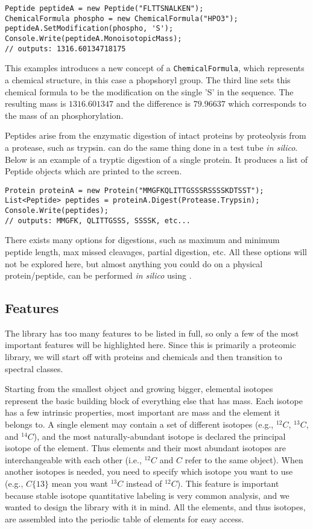 \begin{lstlisting}
Peptide peptideA = new Peptide("FLTTSNALKEN");
ChemicalFormula phospho = new ChemicalFormula("HPO3");
peptideA.SetModification(phospho, 'S');
Console.Write(peptideA.MonoisotopicMass);
// outputs: 1316.60134718175
\end{lstlisting}

This examples introduces a new concept of a \texttt{ChemicalFormula}, which represents a chemical structure, in this case a phopshoryl group. The third line sets this chemical formula to be the modification on the single 'S' in the sequence. The resulting mass is $1316.601347$ and the difference is $79.96637$ which corresponds to the mass of an phosphorylation.

Peptides arise from the enzymatic digestion of intact proteins by proteolysis from a protease, such as trypsin. \csmsl{} can do the same thing done in a test tube \emph{in silico}. Below is an example of a tryptic digestion of a single protein. It produces a list of Peptide objects which are printed to the screen.

\begin{lstlisting}
Protein proteinA = new Protein("MMGFKQLITTGSSSRSSSSKDTSST");
List<Peptide> peptides = proteinA.Digest(Protease.Trypsin);
Console.Write(peptides);
// outputs: MMGFK, QLITTGSSS, SSSSK, etc...
\end{lstlisting}

There exists many options for digestions, such as maximum and minimum peptide length, max missed cleavages, partial digestion, etc. All these options will not be explored here, but almost anything you could do on a physical protein/peptide, can be performed \emph{in silico} using \csmsl{}.

\subsection*{Features}
The \csmsl{} library has too many features to be listed in full, so only a few of the most important features will be highlighted here. Since this is primarily a proteomic library, we will start off with proteins and chemicals and then transition to spectral classes. 

Starting from the smallest object and growing bigger, elemental isotopes represent the basic building block of everything else that has mass. Each isotope has a few intrinsic properties, most important are mass and the element it belongs to. A single element may contain a set of different isotopes (e.g., $^{12}C$, $^{13}C$, and $^{14}C$), and the most naturally-abundant isotope is declared the principal isotope of the element. Thus elements and their most abundant isotopes are interchangeable with each other (i.e., $^{12}C$ and $C$ refer to the same object). When another isotopes is needed, you need to specify which isotope you want to use (e.g., $C\{13\}$ mean you want $^{13}C$ instead of $^{12}C$). This feature is important because stable isotope quantitative labeling is very common analysis, and we wanted to design the library with it in mind. All the elements, and thus isotopes, are assembled into the periodic table of elements for easy access.

